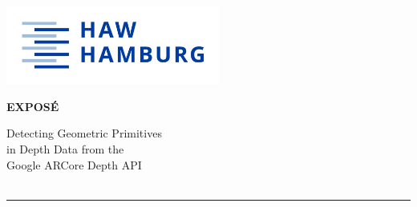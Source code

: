 \begin{titlepage}
  \color{haw}
  \raggedright
  \hfill\includegraphics[width=7cm]{images/HAW_Marke_RGB_300dpi}\\

  \vspace{5cm}

  \setmainfont{Open Sans}
  \small
  \textbf{EXPOSÉ}

  \vspace{8mm}

  \begin{minipage}{0.8\linewidth}
    \setmainfont{Martel Heavy}
    \LARGE

    Detecting Geometric Primitives\\[1mm]
    in Depth Data from the\\[1mm]
    Google ARCore Depth API\\[1mm]
    \,\rule{11mm}{1.2mm}
  \end{minipage}

  \vspace{1cm}


\end{titlepage}
